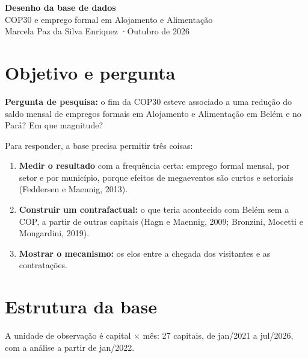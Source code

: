 \documentclass[11pt,a4paper]{article}
\begin{document}
\begin{center}
  {\LARGE\bfseries\color{azul} Desenho da base de dados}\\[4pt]
  {\large COP30 e emprego formal em Alojamento e Alimentação}\\[8pt]
  Marcela Paz da Silva Enriquez \quad·\quad Outubro de 2026
\end{center}

\vspace{6pt}
\noindent{}

\section{Objetivo e pergunta}

\textbf{Pergunta de pesquisa:} o fim da COP30 esteve associado a uma redução do saldo mensal de
empregos formais em Alojamento e Alimentação em Belém e no Pará? Em que magnitude?

Para responder, a base precisa permitir três coisas:
\begin{enumerate}
  \item \textbf{Medir o resultado} com a frequência certa: emprego formal mensal, por setor e por
        município, porque efeitos de megaeventos são curtos e setoriais (Feddersen e Maennig, 2013).
  \item \textbf{Construir um contrafactual:} o que teria acontecido com Belém sem a COP, a partir de
        outras capitais (Hagn e Maennig, 2009; Bronzini, Mocetti e Mongardini, 2019).
  \item \textbf{Mostrar o mecanismo:} os elos entre a chegada dos visitantes e as contratações.
\end{enumerate}

\section{Estrutura da base}

A unidade de observação é capital $\times$ mês: 27 capitais, de jan/2021 a jul/2026, com a análise
a partir de jan/2022.
\end{document}
